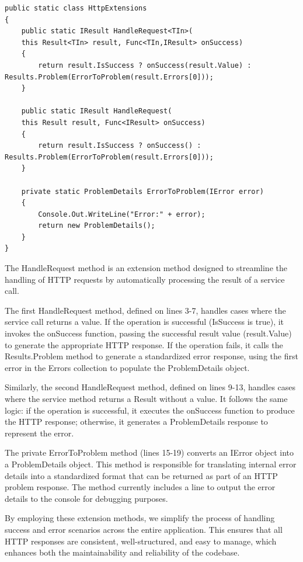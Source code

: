 \begin{lstlisting}[style=sharpc, caption={Custom Extension Methods for Handling HTTP Requests in ASP.NET Core: Simplifying Success and Error Response Handling.}, label={HttpExtensions}]
public static class HttpExtensions
{
	public static IResult HandleRequest<TIn>(
	this Result<TIn> result, Func<TIn,IResult> onSuccess)
	{
		return result.IsSuccess ? onSuccess(result.Value) : Results.Problem(ErrorToProblem(result.Errors[0]));
	}
	
	public static IResult HandleRequest(
	this Result result, Func<IResult> onSuccess)
	{
		return result.IsSuccess ? onSuccess() : Results.Problem(ErrorToProblem(result.Errors[0]));
	}
	
	private static ProblemDetails ErrorToProblem(IError error)
	{
		Console.Out.WriteLine("Error:" + error);
		return new ProblemDetails();
	}
}
\end{lstlisting}


The HandleRequest method is an extension method designed to streamline the handling of HTTP requests by automatically processing the result of a service call.

The first HandleRequest method, defined on lines 3-7, handles cases where the service call returns a value. If the operation is successful (IsSuccess is true), it invokes the onSuccess function, passing the successful result value (result.Value) to generate the appropriate HTTP response. If the operation fails, it calls the Results.Problem method to generate a standardized error response, using the first error in the Errors collection to populate the ProblemDetails object.

Similarly, the second HandleRequest method, defined on lines 9-13, handles cases where the service method returns a Result without a value. It follows the same logic: if the operation is successful, it executes the onSuccess function to produce the HTTP response; otherwise, it generates a ProblemDetails response to represent the error.

The private ErrorToProblem method (lines 15-19) converts an IError object into a ProblemDetails object. This method is responsible for translating internal error details into a standardized format that can be returned as part of an HTTP problem response. The method currently includes a line to output the error details to the console for debugging purposes.

By employing these extension methods, we simplify the process of handling success and error scenarios across the entire application. This ensures that all HTTP responses are consistent, well-structured, and easy to manage, which enhances both the maintainability and reliability of the codebase.

